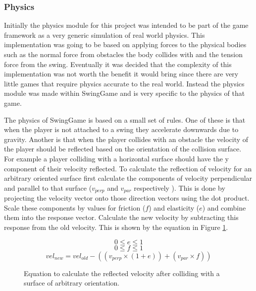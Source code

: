 \documentclass[]{report}
\begin{document}
			\subsubsection{Physics}
			Initially the physics module for this project was intended to be part of the game framework as a very generic simulation of real world physics. This implementation was going to be based on applying forces to the physical bodies such as the normal force from obstacles the body collides with and the tension force from the swing. Eventually it was decided that the complexity of this implementation was not worth the benefit it would bring since there are very little games that require physics accurate to the real world. Instead the physics module was made within SwingGame and is very specific to the physics of that game.
			
			The physics of SwingGame is based on a small set of rules. One of these is that when the player is not attached to a swing they accelerate downwards due to gravity. Another is that when the player collides with an obstacle the velocity of the player should be reflected based on the orientation of the collision surface. For example a player colliding with a horizontal surface should have the y component of their velocity reflected. To calculate the reflection of velocity for an arbitrary oriented surface first calculate the components of velocity perpendicular and parallel to that surface ($v_{perp}$ and $v_{par}$ respectively ). This is done by projecting the velocity vector onto those direction vectors using the dot product. Scale these components by values for friction ($f$) and elasticity ($e$) and combine them into the response vector. Calculate the new velocity by subtracting this response from the old velocity. This is shown by the equation in Figure \ref{collisionResponse}.
			
			\begin{figure}[H]
				\centering
				\begin{displaymath}
					0 \leq e \leq 1
				\end{displaymath}
				\begin{displaymath}
					0 \leq f \leq 1
				\end{displaymath}
				\begin{displaymath}
					vel_{new} = vel_{old} - ((v_{perp} \times (1+e)) + (v_{par} \times f))
				\end{displaymath}
				\caption{Equation to calculate the reflected velocity after colliding with a surface of arbitrary orientation.}
				\label{collisionResponse}
			\end{figure}
			
\end{document}
